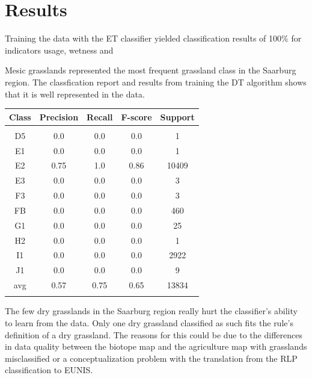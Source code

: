 \documentclass[authoryear, review,12pt,number]{elsarticle}
\begin{document}
\section{Results}
Training the data with the ET classifier yielded classification results of
100\% for indicators usage, wetness and

Mesic grasslands represented the most frequent grassland class in the Saarburg 
region. The classfication report and results from training the DT algorithm  
shows that it is well represented in the data.
\begin{tabular}{c c c c c}
Class & Precision & Recall & F-score & Support\\
\hline\\
D5 & 0.0 & 0.0 & 0.0 & 1\\
E1 & 0.0 & 0.0 & 0.0 & 1\\
E2 & 0.75 & 1.0 & 0.86 & 10409\\
E3 & 0.0 & 0.0 & 0.0 & 3\\
F3 & 0.0 & 0.0 & 0.0 & 3\\
FB & 0.0 & 0.0 & 0.0 & 460\\
G1 & 0.0 & 0.0 & 0.0 & 25\\
H2 & 0.0 & 0.0 & 0.0 & 1\\
I1 & 0.0 & 0.0 & 0.0 & 2922\\
J1 & 0.0 & 0.0 & 0.0 & 9\\
avg & 0.57 & 0.75 & 0.65 & 13834\\
\label{fig_mesic_classification}
\end{tabular}

The few dry grasslands in the Saarburg region really hurt the classifier's 
ability to learn from the data. Only one dry grassland classified as such fits 
the rule's definition of a dry grassland. The reasons for this could be due to 
the differences in data quality between the biotope map and the agriculture map 
with grasslands misclassified or a conceptualization problem with the 
translation from the RLP classification to EUNIS. 
\end{document}
